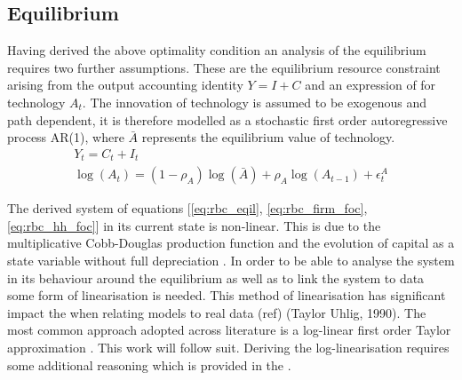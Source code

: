 \documentclass[12pt,a4paper,english]{article} %
\begin{document}
	\subsection{Equilibrium}
	Having derived the above optimality condition an analysis of the equilibrium requires two further assumptions. These are the equilibrium resource constraint arising from the output accounting identity $Y = I + C$ and an expression of for technology $A_t$. The innovation of technology is assumed to be exogenous and path dependent, it is therefore modelled as a stochastic first order autoregressive process AR(1), where $\bar{A}$ represents the equilibrium value of technology.
	\begin{equation} \label{eq:rbc_eqil}
		\begin{aligned}
			Y_t = C_t + I_t \\
			\log(A_t) = (1- \rho_A) \log(\bar{A}) + \rho_A \log(A_{t-1}) + \epsilon_t^A
		\end{aligned}
	\end{equation}

	The derived system of equations [\ref{eq:rbc_eqil}, \ref{eq:rbc_firm_foc}, \ref{eq:rbc_hh_foc}] in its current state is non-linear. This is due to the multiplicative Cobb-Douglas production function and the evolution of capital as a state variable without full depreciation \cite{campbell_inspecting_1994}. In order to be able to analyse the system in its behaviour around the equilibrium as well as to link the system to data some form of linearisation is needed. This method of linearisation has significant impact the when relating models to real data (ref) (Taylor  Uhlig, 1990). The most common approach adopted across literature is a log-linear first order Taylor approximation \cite{campbell_inspecting_1994}. This work will follow suit.
	Deriving the log-linearisation requires some additional reasoning which is provided in the .
	
\end{document}
